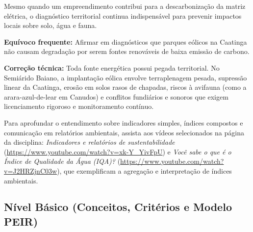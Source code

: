 Mesmo quando um empreendimento contribui para a descarbonização da matriz elétrica, o diagnóstico territorial continua indispensável para prevenir impactos locais sobre solo, água e fauna.

\begin{boxErro}
\textbf{Equívoco frequente:} Afirmar em diagnósticos que parques eólicos na Caatinga não causam degradação por serem fontes renováveis de baixa emissão de carbono.\par
\textbf{Correção técnica:} Toda fonte energética possui pegada territorial. No Semiárido Baiano, a implantação eólica envolve terraplenagem pesada, supressão linear da Caatinga, erosão em solos rasos de chapadas, riscos à avifauna (como a arara-azul-de-lear em Canudos) e conflitos fundiários e sonoros que exigem licenciamento rigoroso e monitoramento contínuo.
\end{boxErro}

Para aprofundar o entendimento sobre indicadores simples, índices compostos e comunicação em relatórios ambientais, assista aos vídeos selecionados na página da disciplina: \textit{Indicadores e relatórios de sustentabilidade} (\url{https://www.youtube.com/watch?v=xk-Y_YivFpU}) e \textit{Você sabe o que é o Índice de Qualidade da Água (IQA)?} (\url{https://www.youtube.com/watch?v=J2HRZjnC03w}), que exemplificam a agregação e interpretação de índices ambientais.


\subsection*{Nível Básico (Conceitos, Critérios e Modelo PEIR)}

